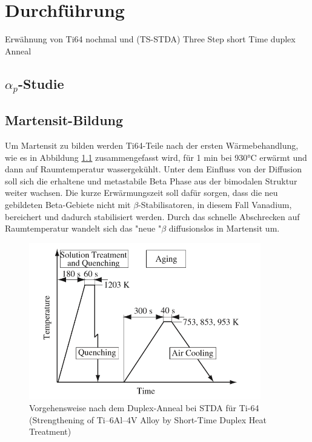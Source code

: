 \chapter{Durchführung}


Erwähnung von Ti64 nochmal und (TS-STDA) Three Step short Time duplex Anneal
\section{$\alpha_p$-Studie}




\section{Martensit-Bildung}


Um Martensit zu bilden werden Ti64-Teile  nach der ersten Wärmebehandlung, wie es in Abbildung \ref{STDA} zusammengefasst wird, für 1 min  bei 930°C erwärmt und dann  auf Raumtemperatur wassergekühlt. Unter dem Einfluss von der Diffusion soll sich die erhaltene und metastabile Beta Phase aus der bimodalen Struktur weiter wachsen. Die kurze Erwärmungszeit soll dafür sorgen, dass die neu gebildeten Beta-Gebiete nicht mit $\beta$-Stabilisatoren, in diesem Fall Vanadium, bereichert  und dadurch stabilisiert werden. Durch das schnelle Abschrecken auf Raumtemperatur wandelt sich das "neue "$\beta$ diffusionslos in Martensit um. 

\begin{figure}[H]
	\centering
	\includegraphics[width=0.9\textwidth]{Bilder/ts-stda}
	\caption{Vorgehensweise nach dem Duplex-Anneal bei STDA für Ti-64 (Strengthening of Ti–6Al–4V Alloy by Short-Time Duplex Heat Treatment)}
	\label{STDA}
\end{figure}

